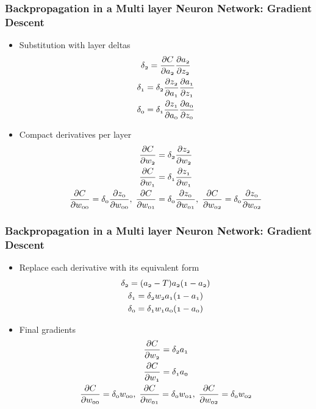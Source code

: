 \documentclass{beamer}
\newcommand{\var}[1]{\mathnormal{#1}}
\begin{document}
\begin{frame}
  \frametitle{Backpropagation in a Multi layer Neuron Network: Gradient Descent}
  \begin{itemize}
    \item Substitution with layer deltas
    \begin{gather}
      \var{\delta_2 = \frac{\partial C}{\partial a_2}\frac{\partial a_2}{\partial z_2}} \\
      \var{\delta_1 = \delta_2\frac{\partial z_2}{\partial a_1}\frac{\partial a_1}{\partial z_1}} \\
      \var{\delta_0 = \delta_1\frac{\partial z_1}{\partial a_0}\frac{\partial a_0}{\partial z_0}}
    \end{gather}
    \item Compact derivatives per layer
    \begin{gather}
      \var{\frac{\partial C}{\partial w_2} = \delta_2\frac{\partial z_2}{\partial w_2}} \\
      \var{\frac{\partial C}{\partial w_1} = \delta_1\frac{\partial z_1}{\partial w_1}} \\
      \var{\frac{\partial C}{\partial w_{00}} = \delta_0\frac{\partial z_0}{\partial w_{00}}},\;
      \var{\frac{\partial C}{\partial w_{01}} = \delta_0\frac{\partial z_0}{\partial w_{01}}},\;
      \var{\frac{\partial C}{\partial w_{02}} = \delta_0\frac{\partial z_0}{\partial w_{02}}}
    \end{gather}
  \end{itemize}
\end{frame}

\begin{frame}
  \frametitle{Backpropagation in a Multi layer Neuron Network: Gradient Descent}
  \begin{itemize}
    \item Replace each derivative with its equivalent form
    \begin{gather}
      \var{\delta_2 = (a_2 - T)a_2(1-a_2)} \\
      \var{\delta_1 = \delta_2 w_2 a_1(1-a_1)} \\
      \var{\delta_0 = \delta_1 w_1 a_0(1-a_0)}
    \end{gather}
    \item Final gradients
    \begin{gather}
      \var{\frac{\partial C}{\partial w_2} = \delta_2 a_1} \\
      \var{\frac{\partial C}{\partial w_1} = \delta_1 a_0} \\
      \var{\frac{\partial C}{\partial w_{00}} = \delta_0 w_{00}},\;
      \var{\frac{\partial C}{\partial w_{01}} = \delta_0 w_{01}},\;
      \var{\frac{\partial C}{\partial w_{02}} = \delta_0 w_{02}}
    \end{gather}
  \end{itemize}
\end{frame}
\end{document}
